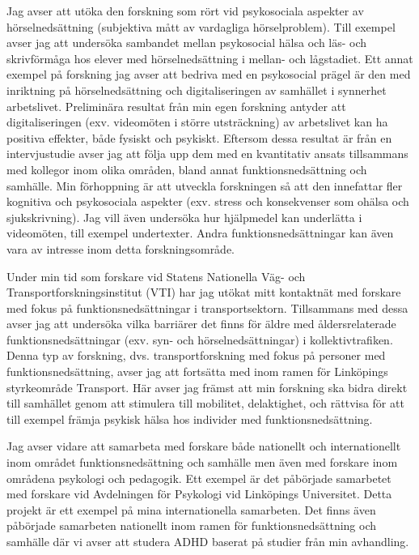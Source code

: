\documentclass[]{article}
\begin{document}
\hfill\break
Jag avser att utöka den forskning som rört vid psykosociala aspekter av
hörselnedsättning (subjektiva mått av vardagliga hörselproblem). Till
exempel avser jag att undersöka sambandet mellan psykosocial hälsa och
läs- och skrivförmåga hos elever med hörselnedsättning i mellan- och
lågstadiet. Ett annat exempel på forskning jag avser att bedriva med en
psykosocial prägel är den med inriktning på hörselnedsättning och
digitaliseringen av samhället i synnerhet arbetslivet. Preliminära
resultat från min egen forskning antyder att digitaliseringen (exv.
videomöten i större utsträckning) av arbetslivet kan ha positiva
effekter, både fysiskt och psykiskt. Eftersom dessa resultat är från en
intervjustudie avser jag att följa upp dem med en kvantitativ ansats
tillsammans med kollegor inom olika områden, bland annat
funktionsnedsättning och samhälle. Min förhoppning är att utveckla
forskningen så att den innefattar fler kognitiva och psykosociala
aspekter (exv. stress och konsekvenser som ohälsa och sjukskrivning).
Jag vill även undersöka hur hjälpmedel kan underlätta i videomöten, till
exempel undertexter. Andra funktionsnedsättningar kan även vara av
intresse inom detta forskningsområde.

\hfill\break
Under min tid som forskare vid Statens Nationella Väg- och
Transportforskningsinstitut (VTI) har jag utökat mitt kontaktnät med
forskare med fokus på funktionsnedsättningar i transportsektorn.
Tillsammans med dessa avser jag att undersöka vilka barriärer det finns
för äldre med åldersrelaterade funktionsnedsättningar (exv. syn- och
hörselnedsättningar) i kollektivtrafiken. Denna typ av forskning, dvs.
transportforskning med fokus på personer med funktionsnedsättning, avser
jag att fortsätta med inom ramen för Linköpings styrkeområde Transport.
Här avser jag främst att min forskning ska bidra direkt till samhället
genom att stimulera till mobilitet, delaktighet, och rättvisa för att
till exempel främja psykisk hälsa hos individer med
funktionsnedsättning.

\hfill\break
Jag avser vidare att samarbeta med forskare både nationellt och
internationellt inom området funktionsnedsättning och samhälle men även
med forskare inom områdena psykologi och pedagogik. Ett exempel är det
påbörjade samarbetet med forskare vid Avdelningen för Psykologi vid
Linköpings Universitet. Detta projekt är ett exempel på mina
internationella samarbeten. Det finns även påbörjade samarbeten
nationellt inom ramen för funktionsnedsättning och samhälle där vi avser
att studera ADHD baserat på studier från min avhandling.
\end{document}

